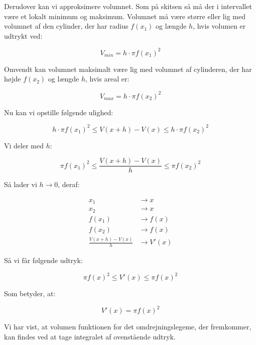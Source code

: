 \begin{proofw}
Derudover kan vi approksimere volumnet. Som på skitsen
så må der i intervallet være et lokalt minimum og maksimum.
Volumnet må være større eller lig med volumnet af den cylinder,
der har radius $f(x_1)$ og længde $h$, hvis volumen er udtrykt ved:

$$
    V_{min}=h \cdot \pi f(x_1)^2
$$

Omvendt kan volumnet maksimalt være lig med volumnet af cylinderen,
der har højde $f(x_2)$ og længde $h$, hvis areal er:

$$
    V_{max}=h \cdot \pi f(x_2)^2
$$

Nu kan vi opstille følgende ulighed:

$$
h \cdot \pi f(x_1)^2
\leq
V(x+h)-V(x)
\leq
h \cdot \pi f(x_2)^2
$$

Vi deler med $h$:

$$
\pi f(x_1)^2
\leq
\frac{V(x+h)-V(x)}{h}
\leq
 \pi f(x_2)^2
$$

Så lader vi $h \rightarrow 0$, deraf:

\begin{align*}
     x_1 &\rightarrow x \\
    x_2 &\rightarrow x \\
    f(x_1) &\rightarrow f(x) \\
    f(x_2) &\rightarrow f(x) \\
    \frac{V(x+h)-V(x)}{h} &\rightarrow V'(x)
\end{align*}

Så vi får følgende udtryk:

$$
\pi f(x)^2
\leq
V'(x)
\leq
 \pi f(x)^2
$$

Som betyder, at:

$$
V'(x)
=\pi f(x)^2
$$

Vi har vist, at volumen funktionen for det omdrejningslegeme, der fremkommer,
kan findes ved at tage integralet af ovenstående udtryk.

\end{proofw}
